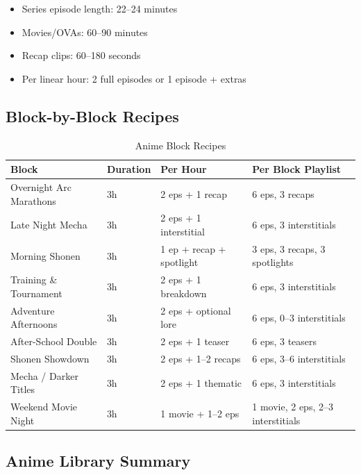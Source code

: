 \documentclass[12pt,letterpaper,twoside]{report}
\begin{document}
\begin{itemize}[leftmargin=1.5cm]
    \item Series episode length: 22--24 minutes
    \item Movies/OVAs: 60--90 minutes
    \item Recap clips: 60--180 seconds
    \item Per linear hour: 2 full episodes or 1 episode + extras
\end{itemize}

\subsection{Block-by-Block Recipes}

\begin{table}[H]
\centering
\caption{Anime Block Recipes}
\label{tab:anime-recipes}
\begin{tabular}{@{}L{4cm}L{2cm}L{3cm}L{4.5cm}@{}}
\toprule
\textbf{Block} & \textbf{Duration} & \textbf{Per Hour} & \textbf{Per Block Playlist} \\
\midrule
Overnight Arc Marathons & 3h & 2 eps + 1 recap & 6 eps, 3 recaps \\
Late Night Mecha & 3h & 2 eps + 1 interstitial & 6 eps, 3 interstitials \\
Morning Shonen & 3h & 1 ep + recap + spotlight & 3 eps, 3 recaps, 3 spotlights \\
Training \& Tournament & 3h & 2 eps + 1 breakdown & 6 eps, 3 interstitials \\
Adventure Afternoons & 3h & 2 eps + optional lore & 6 eps, 0--3 interstitials \\
After-School Double & 3h & 2 eps + 1 teaser & 6 eps, 3 teasers \\
Shonen Showdown & 3h & 2 eps + 1--2 recaps & 6 eps, 3--6 interstitials \\
Mecha / Darker Titles & 3h & 2 eps + 1 thematic & 6 eps, 3 interstitials \\
Weekend Movie Night & 3h & 1 movie + 1--2 eps & 1 movie, 2 eps, 2--3 interstitials \\
\bottomrule
\end{tabular}
\end{table}

\subsection{Anime Library Summary}
\end{document}
